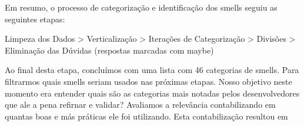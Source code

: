 Em resumo, o processo de categoriza\c{c}\~ao e identifica\c{c}\~ao dos smells seguiu as seguintes etapas:

Limpeza dos Dados > Verticaliza\c{c}\~ao > Itera\c{c}\~oes de Categoriza\c{c}\~ao > Divis\~oes > Elimina\c{c}\~ao das Dúvidas (respostas marcadas com maybe)

Ao final desta etapa, concluímos com uma lista com 46 categorias de smells. Para filtrarmos quais smells seriam usados nas pr\'oximas etapas. Nosso objetivo neste momento era entender quais s\~ao as categorias mais notadas pelos desenvolvedores que ale a pena refirnar e validar? Avaliamos a relevância contabilizando em quantas boas e m\'as pr\'aticas ele foi utilizando. Esta contabiliza\c{c}\~ao resultou em